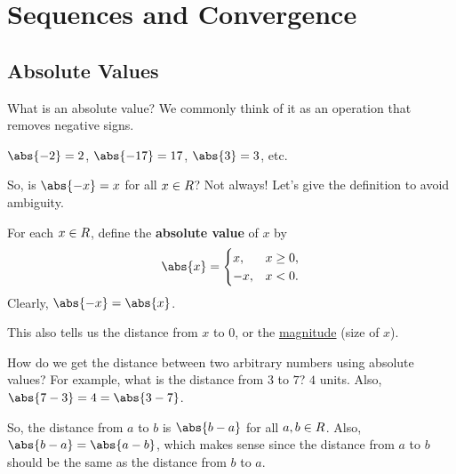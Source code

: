 \chapter{Sequences and Convergence}
\section{Absolute Values}
What is an absolute value? We commonly think of it as an operation that removes negative signs.
\begin{Example}{}{}
    $ \abs{-2}=2 $, $ \abs{-17}=17 $, $ \abs{3}=3 $, etc.
\end{Example}
So, is $ \abs{-x}=x $ for all $ x\in\relax{R}$? Not always! Let's give the definition to avoid ambiguity.
\begin{Definition}{}{}
    For each $ x\in\relax{R} $, define the \textbf{absolute value} of $ x $ by
    \[ \abs{x}=\begin{cases}
            x,  & x\ge 0, \\
            -x, & x<0.
        \end{cases} \]
    Clearly, $ \abs{-x}=\abs{x} $.
\end{Definition}
This also tells us the distance from $ x $ to $ 0 $, or the \underline{magnitude} (size of $ x $).
\begin{Example}{}{}
    How do we get the distance between two arbitrary numbers using absolute values? For example, what is
    the distance from $ 3 $ to $ 7 $? $ 4 $ units. Also, $ \abs{7-3}=4=\abs{3-7} $.
\end{Example}
So, the distance from $ a $ to $ b $ is $ \abs{b-a} $ for all $ a,b\in\relax{R} $. Also,
$ \abs{b-a}=\abs{a-b} $, which makes sense since the distance from $ a $ to $ b $ should be the same as
the distance from $ b $ to $ a $.
